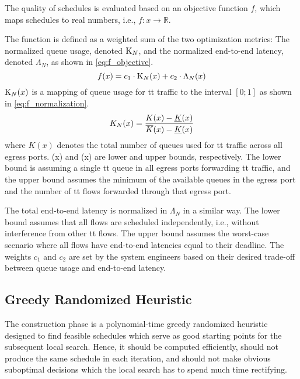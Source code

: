 The quality of schedules is evaluated based on an objective function $f$, which maps schedules to real numbers, i.e., $f: x \to \mathbb{R}$.
\begin{modifiedparagraph}
The function is defined as a weighted sum of the two optimization metrics: The normalized queue usage, denoted $\mathrm{K}_N$, and the normalized end-to-end latency, denoted $\Lambda_N$, as shown in \autoref{eq:f_objective}.
\begin{equation}
   \label{eq:f_objective}
   f(x) = c_1 \cdot \mathrm{K}_N(x) + c_2 \cdot \Lambda_N(x)
\end{equation}
$\mathrm{K}_N(x)$ is a mapping of queue usage for \gls{tt} traffic to the interval $[0;1]$ as shown in \autoref{eq:f_normalization}.
\begin{equation}
   \label{eq:f_normalization}
   K_N(x) = \frac{ K(x) - \underline{K}(x)}{\overline{K}(x) - \underline{K}(x)}
\end{equation}
where $K(x)$ denotes the total number of queues used for \gls{tt} traffic across all egress ports. (x) and (x) are lower and upper bounds, respectively. The lower bound is assuming a single \gls{tt} queue in all egress ports forwarding \gls{tt} traffic, and the upper bound assumes the minimum of the available queues in the egress port and the number of \gls{tt} flows forwarded through that egress port.

The total end-to-end latency is normalized in $\Lambda_N$ in a similar way. The lower bound assumes that all flows are scheduled independently, i.e., without interference from other \gls{tt} flows. The upper bound assumes the worst-case scenario where all flows have end-to-end latencies equal to their deadline. The weights $c_1$ and $c_2$ are set by the system engineers based on their desired trade-off between queue usage and end-to-end latency. 
\end{modifiedparagraph}


\subsection{Greedy Randomized Heuristic} \label{sec:construction_phase}
The construction phase is a polynomial-time greedy randomized heuristic designed to find feasible schedules which serve as good starting points for the subsequent local search. Hence, it should be computed efficiently, should not produce the same schedule in each iteration, and should not make obvious suboptimal decisions which the local search has to spend much time rectifying.

